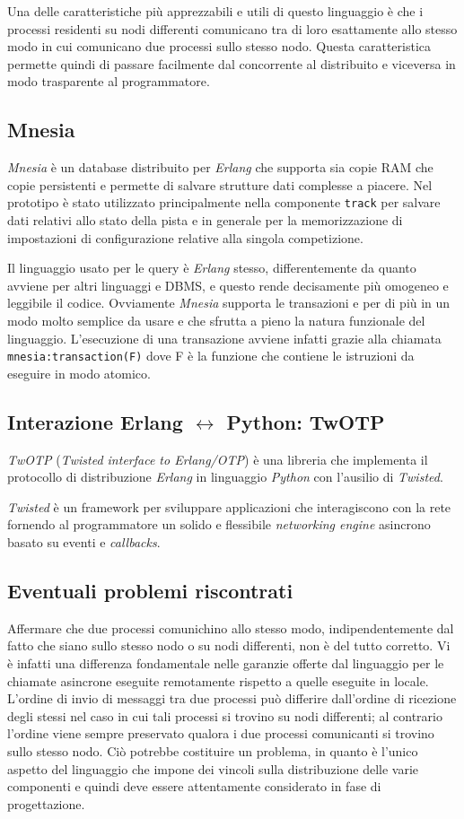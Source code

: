 \documentclass[11pt,a4paper]{report}
\newcommand{\Erlang}{\textsl{Erlang}}
\newcommand{\Python}{\textsl{Python}}
\newcommand{\fun}[1]{\texttt{#1}}
\begin{document}
Una delle caratteristiche più apprezzabili e utili di questo linguaggio è che i processi residenti su nodi differenti comunicano tra di loro esattamente allo stesso modo in cui comunicano due processi sullo stesso nodo. Questa caratteristica permette quindi di passare facilmente dal concorrente al distribuito e viceversa in modo trasparente al programmatore.

\subsection*{Mnesia}
\textsl{Mnesia} è un database distribuito per \Erlang{} che supporta sia copie RAM che copie persistenti e permette di salvare strutture dati complesse a piacere. Nel prototipo è stato utilizzato principalmente nella componente \texttt{track} per salvare dati relativi allo stato della pista e in generale per la memorizzazione di impostazioni di configurazione relative alla singola competizione.

Il linguaggio usato per le query è \Erlang{} stesso, differentemente da quanto avviene per altri linguaggi e DBMS, e questo rende decisamente più omogeneo e leggibile il codice. Ovviamente \textsl{Mnesia} supporta le transazioni e per di più in un modo molto semplice da usare e che sfrutta a pieno la natura funzionale del linguaggio. L'esecuzione di una transazione avviene infatti grazie alla chiamata \fun{mnesia:transaction(F)} dove F è la funzione che contiene le istruzioni da eseguire in modo atomico.

\subsection*{Interazione Erlang $\leftrightarrow$ Python: TwOTP}
\textsl{TwOTP} (\textit{Twisted interface to Erlang/OTP}) è una libreria che implementa il protocollo di distribuzione \Erlang{} in linguaggio \Python{} con l'ausilio di \textsl{Twisted}.

\textsl{Twisted} è un framework per sviluppare applicazioni che interagiscono con la rete fornendo al programmatore un solido e flessibile \textit{networking engine} asincrono basato su eventi e \textit{callbacks}.

\subsection*{Eventuali problemi riscontrati}
Affermare che due processi comunichino allo stesso modo, indipendentemente dal fatto che siano sullo stesso nodo o su nodi differenti, non è del tutto corretto. Vi è infatti una differenza fondamentale nelle garanzie offerte dal linguaggio per le chiamate asincrone eseguite remotamente rispetto a quelle eseguite in locale. L'ordine di invio di messaggi tra due processi può differire dall'ordine di ricezione degli stessi nel caso in cui tali processi si trovino su nodi differenti; al contrario l'ordine viene sempre preservato qualora i due processi comunicanti si trovino sullo stesso nodo. Ciò potrebbe costituire un problema, in quanto è l'unico aspetto del linguaggio che impone dei vincoli sulla distribuzione delle varie componenti e quindi deve essere attentamente considerato in fase di progettazione.
\end{document}
